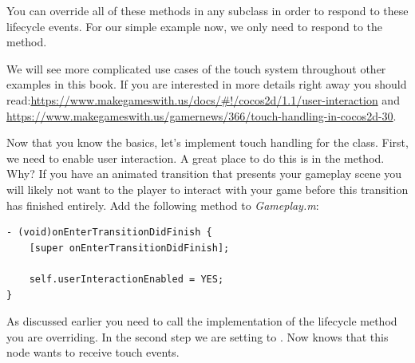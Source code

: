 You can override all of these methods in any \ccnode{} subclass in order to
respond to these lifecycle events. For our simple example now, we only need to
respond to the  method.

\begin{details}[frametitle={The \cocos{} Touch System}]
We will see more complicated use cases of the \cocos{} touch system throughout
other examples in this book. If you are interested in more details right away
you should
read:\url{https://www.makegameswith.us/docs/#!/cocos2d/1.1/user-interaction} and
\url{https://www.makegameswith.us/gamernews/366/touch-handling-in-cocos2d-30}.
\end{details}

Now that you know the basics, let's implement touch handling for the
 class. First, we need to enable user interaction. A great
place to do this is in the  method. Why?
If you have an animated transition that presents your gameplay scene you will
likely not want to the player to interact with your game before this transition
has finished entirely. Add the following method to \textit{Gameplay.m}:
\begin{lstlisting}
- (void)onEnterTransitionDidFinish {
    [super onEnterTransitionDidFinish];
    
    self.userInteractionEnabled = YES;
}
\end{lstlisting}
As discussed earlier you need to call the  implementation of
the lifecycle method you are overriding. In the second step we are setting
 to . Now \cocos{} knows that
this node wants to receive touch events. 

